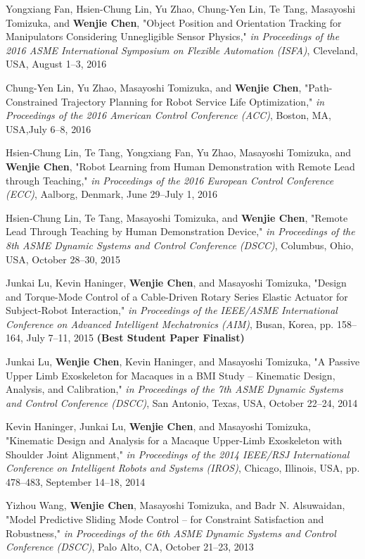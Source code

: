 \documentclass[UTF8,fontset=none]{res}
\begin{document}
\begin{resume}
\begin{etaremune}[start=26]
    \item Yongxiang Fan, Hsien-Chung Lin, Yu Zhao, Chung-Yen Lin, Te Tang, Masayoshi Tomizuka, and \textbf{Wenjie Chen}, "Object Position and Orientation Tracking for Manipulators Considering Unnegligible Sensor Physics," \emph{in Proceedings of the 2016 ASME International Symposium on Flexible Automation (ISFA)}, Cleveland, USA, August 1--3, 2016
    \item Chung-Yen Lin, Yu Zhao, Masayoshi Tomizuka, and \textbf{Wenjie Chen}, "Path-Constrained Trajectory Planning for Robot Service Life Optimization," \emph{in Proceedings of the 2016 American Control Conference (ACC)}, Boston, MA, USA,July 6--8, 2016
    \item Hsien-Chung Lin, Te Tang, Yongxiang Fan, Yu Zhao, Masayoshi Tomizuka, and \textbf{Wenjie Chen}, "Robot Learning from Human Demonstration with Remote Lead through Teaching," \emph{in Proceedings of the 2016 European Control Conference (ECC)}, Aalborg, Denmark, June 29--July 1, 2016
    \item Hsien-Chung Lin, Te Tang, Masayoshi Tomizuka, and \textbf{Wenjie Chen}, "Remote Lead Through Teaching by Human Demonstration Device," \emph{in Proceedings of the 8th ASME Dynamic Systems and Control Conference (DSCC)}, Columbus, Ohio, USA, October 28--30, 2015
    \item Junkai Lu, Kevin Haninger, \textbf{Wenjie Chen}, and Masayoshi Tomizuka, "Design and Torque-Mode Control of a Cable-Driven Rotary Series Elastic Actuator for Subject-Robot Interaction," \emph{in Proceedings of the IEEE/ASME International Conference on Advanced Intelligent Mechatronics (AIM)}, Busan, Korea, pp. 158--164, July 7--11, 2015 \textbf{(Best Student Paper Finalist)} 
    \item Junkai Lu, \textbf{Wenjie Chen}, Kevin Haninger, and Masayoshi Tomizuka, "A Passive Upper Limb Exoskeleton for Macaques in a BMI Study -- Kinematic Design, Analysis, and Calibration," \emph{in Proceedings of the 7th ASME Dynamic Systems and Control Conference (DSCC)}, San Antonio, Texas, USA, October 22--24, 2014
    \item Kevin Haninger, Junkai Lu, \textbf{Wenjie Chen}, and Masayoshi Tomizuka, "Kinematic Design and Analysis for a Macaque Upper-Limb Exoskeleton with Shoulder Joint Alignment," \emph{in Proceedings of the 2014 IEEE/RSJ International Conference on Intelligent Robots and Systems (IROS)}, Chicago, Illinois, USA, pp. 478--483, September 14--18, 2014
    \item Yizhou Wang, \textbf{Wenjie Chen}, Masayoshi Tomizuka, and Badr N. Alsuwaidan, "Model Predictive Sliding Mode Control -- for Constraint Satisfaction and Robustness," \emph{in Proceedings of the 6th ASME Dynamic Systems and Control Conference (DSCC)}, Palo Alto, CA, October 21--23, 2013

\end{etaremune}
\end{resume}
\end{document}
